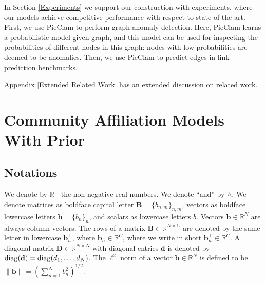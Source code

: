 \documentclass{article}
\theoremstyle{plain}
\theoremstyle{definition}
\theoremstyle{remark}
\begin{document}
In Section \ref{Experiments} we support our construction with experiments, where our models achieve competitive performance with respect to state of the art.
First, we use PieClam to perform graph anomaly detection. Here, PieClam learns a probabilistic model given graph, and this model can be used for inspecting the probabilities of different nodes in this graph: nodes with low probabilities are deemed to be anomalies.  Then, we use PieClam to predict edges in link prediction benchmarks.


%


Appendix \ref{Extended Related Work} has 
an extended discussion on related work.

\section{Community Affiliation Models With Prior}



\subsection{Notations}
\label{def:notations}
We denote by $\mathbb{R}_+$ the non-negative real numbers. We denote ``and'' by $\wedge$.
We denote matrices as boldface capital letter $\mathbf{B}=\{b_{n,m}\}_{n,m}$, vectors as boldface lowercase letters $\mathbf{b}=\{b_n\}_n$,  and scalars as  lowercase letters $b$. Vectors $\mathbf{b}\in\mathbb{R}^N$ are always column vectors. %
 The rows of a matrix $\mathbf{B}\in\mathbb{R}^{N\times C}$ are denoted by the same letter in lowercase $\mathbf{b}_n^{\top }$, where $\mathbf{b}_n\in\mathbb{R}^C$, where we write in short $\mathbf{b}_n^{\top }\in\mathbb{R}^C$. A diagonal matrix $\mathbf{D}\in\mathbb{R}^{N\times N}$ with diagonal entries $\mathbf{d}$ is denoted by ${\rm diag}(\mathbf{d})={\rm diag}(d_1,\ldots, d_N)$.  The $\ell^2$ norm of a vector $\mathbf{b} \in \mathbb{R}^N$ is defined to be $\|\mathbf{b}\| = (\sum_{n=1}^Nb_n^2)^{1/2}$. 
\end{document}
